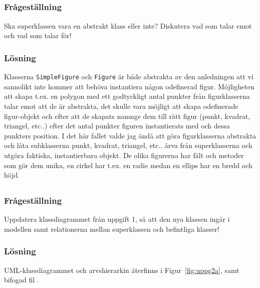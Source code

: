 \subsection{}\label{sec:uppg2b}
\subsubsection*{Frågeställning}
Ska superklassen vara en abstrakt klass eller inte? Diskutera vad som talar
emot och vad som talar för!

\subsubsection*{Lösning}
Klasserna \texttt{SimpleFigure} och \texttt{Figure} är både abstrakta av den
anledningen att vi sannolikt inte kommer att behöva instantiera någon odefinerad
figur. Möjligheten att skapa t.ex. en polygon med ett godtyckligt antal punkter
från figurklasserna talar emot att de är abstrakta, det skulle vara möjligt att
skapa odefinerade figur-objekt och efter att de skapats namnge dem till 
rätt figur (punkt, kvadrat, triangel, etc..) efter det antal punkter figuren 
instantierats med och dessa punkters position.
I det här fallet valde jag ändå att göra figurklasserna abstrakta och låta
subklasserna punkt, kvadrat, triangel, etc.. ärva från superklasserna och
utgöra faktiska, instantierbara objekt.
De olika figurerna har fält och metoder som gör dem unika, en cirkel har t.ex.
en radie medan en ellips har en bredd och höjd.


\subsection{}\label{sec:uppg2c}
\subsubsection*{Frågeställning}
Uppdatera klassdiagrammet från uppgift 1, så att den nya klassen ingår i
modellen samt relationerna mellan superklassen och befintliga klasser!

\subsubsection*{Lösning}
\par UML-klassdiagrammet och arvshierarkin återfinns i Figur~\ref{fig:uppg2a},
 samt bifogad fil .


